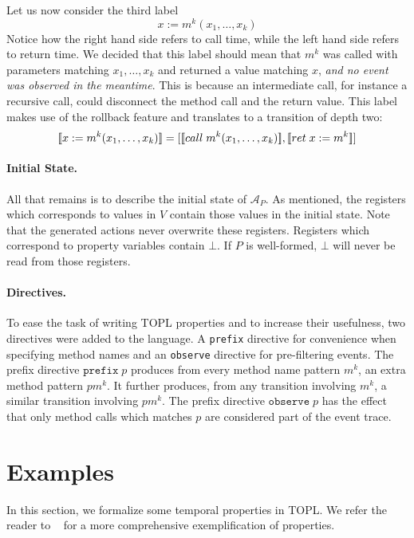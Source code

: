 \documentclass[9pt, preprint]{sigplanconf} %
\newcommand{\A}{\ensuremath{\mathcal{A}}}
\theoremstyle{definition}
\theoremstyle{remark}
\begin{document}
Let us now consider the third label
\[
x := m^k(x_1, \ldots, x_k)
\]
Notice how the right hand side refers to call time, while the left
hand side refers to return time. We decided that this label should
mean that $m^k$ was called with parameters matching $x_1, \ldots, x_k$
and returned a value matching $x$, \emph{and no event was observed in
  the meantime}. This is because an intermediate call, for instance a
recursive call, could disconnect the method call and the return value.
This label makes use of the rollback feature and translates to a
transition of depth two:
\[
[\![x := m^k(x_1, \ldots, x_k)]\!]
=
[[\![call\;m^k(x_1, \ldots, x_k)]\!], [\![ret\;x := m^k]\!]]
\]

\paragraph{Initial State.}
All that remains is to describe the initial state of $\A_P$.
As mentioned, the registers which corresponds to values in $V$
contain those values in the initial state. Note that the generated
actions never overwrite these registers. Registers which correspond
to property variables contain $\bot$. If $P$ is well-formed, $\bot$
will never be read from those registers.

\paragraph{Directives.}
To ease the task of writing TOPL properties and to increase their
usefulness, two directives were added to the language. A \texttt{prefix}
directive for convenience when specifying method names and an
\texttt{observe} directive for pre-filtering events.
%
The prefix directive $\mathtt{prefix}\; p$ produces from every
method name pattern $m^k$, an extra method pattern $pm^k$. It further
produces, from any transition involving $m^k$, a similar transition
involving $pm^k$.
%
The prefix directive $\mathtt{observe}\; p$ has the effect that only
method calls which matches $p$ are considered part of the event trace.

\section{Examples} \label{sec:examples} %

In this section, we formalize some temporal properties in TOPL. We refer the reader to ~\cite{our-fool2011} for a more comprehensive
exemplification of properties.
\end{document}
